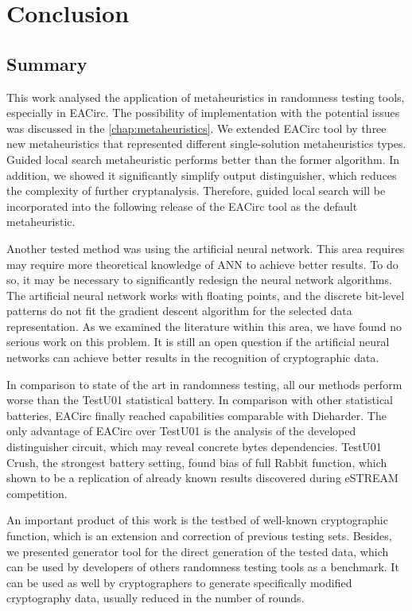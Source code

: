 \documentclass[
  print, %
  Table,   %
  nolof,     %
  nolot,     %
  11pt, %
  oneside  %
]{fithesis3}
\begin{document}
\chapter{Conclusion}
\label{chap:conclusion}

\section{Summary}
\label{sec:conclusion-summary}

This work analysed the application of metaheuristics in randomness testing tools, especially in EACirc. The possibility of implementation with the potential issues was discussed in the \cref{chap:metaheuristics}. We extended EACirc tool by three new metaheuristics that represented different single-solution metaheuristics types. Guided local search metaheuristic performs better than the former algorithm. In addition, we showed it significantly simplify output distinguisher, which reduces the complexity of further cryptanalysis. Therefore, guided local search will be incorporated into the following release of the EACirc tool as the default metaheuristic.

Another tested method was using the artificial neural network. This area requires may require more theoretical knowledge of ANN to achieve better results. To do so, it may be necessary to significantly redesign the neural network algorithms. The artificial neural network works with floating points, and the discrete bit-level patterns do not fit the gradient descent algorithm for the selected data representation. As we examined the literature within this area, we have found no serious work on this problem. It is still an open question if the artificial neural networks can achieve better results in the recognition of cryptographic data.

In comparison to state of the art in randomness testing, all our methods perform worse than the TestU01 statistical battery. In comparison with other statistical batteries, EACirc finally reached capabilities comparable with Dieharder. The only advantage of EACirc over TestU01 is the analysis of the developed distinguisher circuit, which may reveal concrete bytes dependencies. TestU01 Crush, the strongest battery setting, found bias of full Rabbit function, which shown to be a replication of already known results discovered during eSTREAM competition.

An important product of this work is the testbed of well-known cryptographic function, which is an extension and correction of previous testing sets. Besides, we presented generator tool for the direct generation of the tested data, which can be used by developers of others randomness testing tools as a benchmark. It can be used as well by cryptographers to generate specifically modified cryptography data, usually reduced in the number of rounds.
\end{document}
